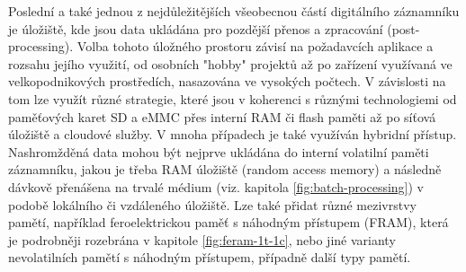 Poslední a také jednou z nejdůležitějších všeobecnou částí digitálního záznamníku je úložiště, kde jsou data ukládána pro pozdější přenos a zpracování (post-processing). Volba tohoto úložného prostoru závisí na požadavcích aplikace a rozsahu jejího využití, od osobních "hobby" projektů až po zařízení využívaná ve velkopodnikových prostředích, nasazována ve vysokých počtech. V závislosti na tom lze využít různé strategie, které jsou v koherenci s různými technologiemi od paměťových karet SD a eMMC přes interní RAM či flash paměti až po síťová úložiště a cloudové služby. V mnoha případech je také využíván hybridní přístup. Nashromžděná data mohou být nejprve ukládána do interní volatilní paměti záznamníku, jakou je třeba RAM úložiště (random access memory) a následně dávkově přenášena na trvalé médium (viz. kapitola \ref{fig:batch-processing}) v podobě lokálního či vzdáleného úložiště. Lze také přidat různé mezivrstvy pamětí, například feroelektrickou paměť s náhodným přístupem (FRAM), která je podrobněji rozebrána v kapitole \ref{fig:feram-1t-1c}, nebo jiné varianty nevolatilních pamětí s náhodným přístupem, případně další typy pamětí. \cite{rta_local_vs_cloud} 

